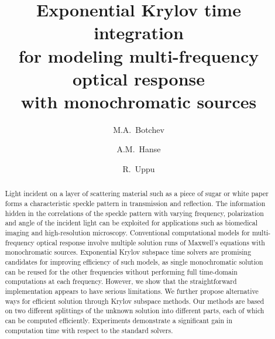 \documentclass[11pt]{elsarticle}
\begin{document}
\begin{frontmatter}
  
\title{Exponential Krylov time integration\\
for modeling multi-frequency optical response\\ 
with monochromatic sources}

\author[kiam,sk]{M.A.~Botchev}

\author[scho,ut1]{A.M.~Hanse}

\author[ut2]{R.~Uppu}


\address[kiam]{Keldysh Institute of Applied Mathematics,
Russian Academy of Sciences, Miusskaya~Sq.~4, 125047 Moscow,
Russia}

\address[sk]{Skolkovo Institute of Science and Technology, Skolkovo Innovation Center, Bldg~3,
143026 Moscow, Russia}

\address[scho]{International School Twente, Het Stedelijk Lyceum, 
               Tiemeister~20, 7541WG Enschede, the Netherlands}

\address[ut1]{Department of Applied Mathematics and MESA+ Institute for 
Nanotechnology, University of Twente, P.O.~Box 217, 7500~AE
Enschede, the Netherlands}

\address[ut2]{Complex Photonic Systems group (COPS) and MESA+ Institute for 
Nanotechnology, University of Twente, P.O.~Box 217, 7500~AE
Enschede, the Netherlands}


\begin{abstract}
Light incident on a layer of scattering material such as a piece of 
sugar or white paper forms a characteristic speckle pattern in 
transmission and reflection. The information hidden in the correlations 
of the speckle pattern with varying frequency, polarization and angle 
of the incident light can be exploited for applications such as 
biomedical imaging and high-resolution microscopy. Conventional 
computational models for multi-frequency optical response involve 
multiple solution runs of Maxwell's equations with monochromatic sources.  
Exponential Krylov subspace time solvers are promising candidates for 
improving efficiency of such models, as single monochromatic solution 
can be reused for the other frequencies without performing full 
time-domain computations at each frequency. However, we show that 
the straightforward implementation appears to have serious limitations. 
We further propose alternative ways for efficient solution through 
Krylov subspace methods. Our methods are based on two different 
splittings of the unknown solution into different parts, each 
of which can be computed efficiently.  Experiments demonstrate 
a significant gain in computation time with respect to the 
standard solvers.
\end{abstract}


\end{frontmatter}
\end{document}
